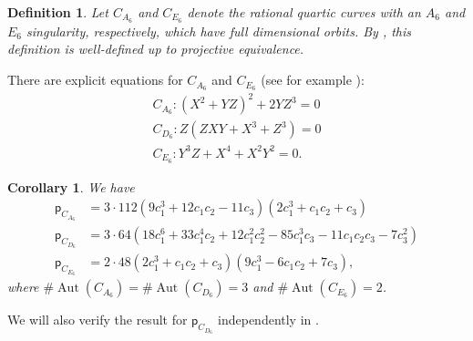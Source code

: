 \documentclass[12 pt, reqno]{amsart}
\newtheorem{cor}[thm]{Corollary}
\newtheorem{defn}[thm]{Definition}
\theoremstyle{definition}
\newcommand{\on}{\operatorname}
\newcommand{\p}{\mathsf{p}}
\begin{document}
\begin{defn}
  \label{def:specialcurves}
  Let $C_{A_6}$ and $C_{E_6}$ denote the rational quartic curves with
  an $A_6$ and $E_6$ singularity, respectively, which have full
  dimensional orbits. By , this definition is
  well-defined up to projective equivalence.
\end{defn}

There are explicit equations for $C_{A_6}$ and $C_{E_6}$ (see for
example \cite[Section 3.4]{Nejad2}):
\begin{align}
  \label{eq:sings}
  C_{A_6}: (X^2+YZ)^2+2YZ^3=0\\
  C_{D_6}: Z(ZXY+X^3+Z^3)=0\\
  C_{E_6}: Y^3Z+X^4+X^2Y^2=0.
\end{align}


\begin{cor}
\label{A6E6orbit}
We have
\begin{align*}
  \p_{C_{A_6}}&= 3\cdot112 (9 c_1^3 + 12 c_1 c_2 - 11 c_3) (2 c_1^3 + c_1 c_2 + c_3)\\
  \p_{C_{D_6}}&=3\cdot 64 (18 c_1^6 + 33 c_1^4 c_2 + 12 c_1^2 c_2^2 - 85 c_1^3 c_3 - 11 c_1 c_2 c_3 - 
                7 c_3^2)\\
  \p_{C_{E_6}}&= 2\cdot 48 (2 c_1^3 + c_1 c_2 + c_3) (9 c_1^3 - 6 c_1 c_2 + 7 c_3),
\end{align*}
where $\#\on{Aut}(C_{A_6})=\# \on{Aut}(C_{D_6})=3$ and
$\#\on{Aut}(C_{E_6})=2$.
\end{cor}

We will also verify the result for $\p_{C_{D_6}}$ independently in
.
\end{document}
